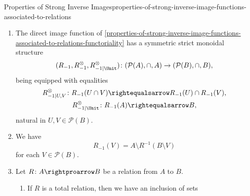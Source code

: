 \begin{proposition}{Properties of Strong Inverse Images}{properties-of-strong-inverse-image-functions-associated-to-relations}
\begin{enumerate}
\[            \]%
            being equipped with inclusions%
            \[
                \begin{gathered}
                    R^{\otimes}_{-1|U,V}   \colon R_{-1}(U)\cup R_{-1}(V) \subset R_{-1}(U\cup V),\\
                    R^{\otimes}_{-1|\Unit} \colon \emptyset               \subset R_{-1}(\emptyset),
                \end{gathered}
            \]%
            natural in $U,V\in\mathcal{P}(B)$.
        \item\label{properties-of-strong-inverse-image-functions-associated-to-relations-symmetric-strict-monoidality-with-respect-to-intersections}The direct image function of \cref{properties-of-strong-inverse-image-functions-associated-to-relations-functoriality} has a symmetric strict monoidal structure
            \[
                (R_{-1},R^{\otimes}_{-1},R^{\otimes}_{-1|\Unit})
                \colon
                (\mathcal{P}(A),\cap,A)
                \to
                (\mathcal{P}(B),\cap,B),
            \]%
            being equipped with equalities%
            \[
                \begin{gathered}
                    R^{\otimes}_{-1|U,V}   \colon R_{-1}(U\cap V) \rightequalsarrow R_{-1}(U)\cap R_{-1}(V),\\
                    R^{\otimes}_{-1|\Unit} \colon R_{-1}(A)       \rightequalsarrow B,
                \end{gathered}
            \]%
            natural in $U,V\in\mathcal{P}(B)$.
        \item\label{properties-of-strong-inverse-image-functions-associated-to-relations-interaction-with-weak-inverse-images-1}We have
            \[
                R_{-1}(V)%
                =%
                A\setminus R^{-1}(B\setminus V)
            \]%
            for each $V\in\mathcal{P}(B)$.
        \item\label{properties-of-strong-inverse-image-functions-associated-to-relations-interaction-with-weak-inverse-images-2}Let $R\colon A\rightproarrow B$ be a relation from $A$ to $B$.
            \begin{enumerate}
                \item\label{properties-of-strong-inverse-image-functions-associated-to-relations-interaction-with-weak-inverse-images-2-a}If $R$ is a total relation, then we have an inclusion of sets

\end{enumerate}
\end{enumerate}
\end{proposition}

